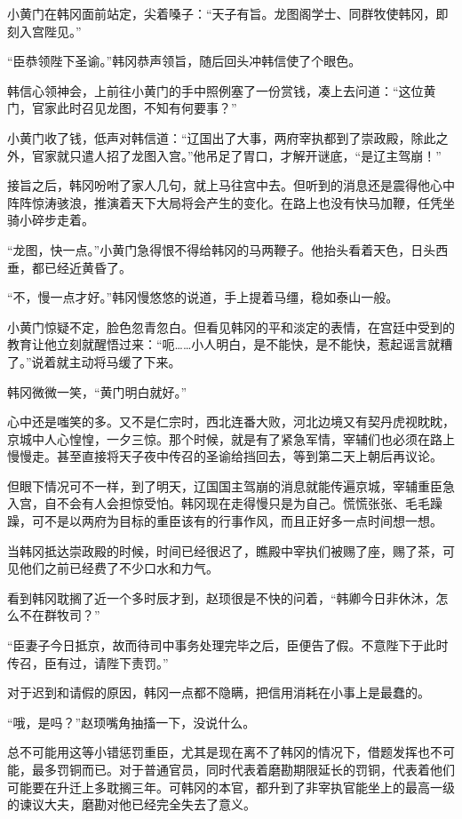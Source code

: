 小黄门在韩冈面前站定，尖着嗓子：“天子有旨。龙图阁学士、同群牧使韩冈，即刻入宫陛见。”

“臣恭领陛下圣谕。”韩冈恭声领旨，随后回头冲韩信使了个眼色。

韩信心领神会，上前往小黄门的手中照例塞了一份赏钱，凑上去问道：“这位黄门，官家此时召见龙图，不知有何要事？”

小黄门收了钱，低声对韩信道：“辽国出了大事，两府宰执都到了崇政殿，除此之外，官家就只遣人招了龙图入宫。”他吊足了胃口，才解开谜底，“是辽主驾崩！”

接旨之后，韩冈吩咐了家人几句，就上马往宫中去。但听到的消息还是震得他心中阵阵惊涛骇浪，推演着天下大局将会产生的变化。在路上也没有快马加鞭，任凭坐骑小碎步走着。

“龙图，快一点。”小黄门急得恨不得给韩冈的马两鞭子。他抬头看着天色，日头西垂，都已经近黄昏了。

“不，慢一点才好。”韩冈慢悠悠的说道，手上提着马缰，稳如泰山一般。

小黄门惊疑不定，脸色忽青忽白。但看见韩冈的平和淡定的表情，在宫廷中受到的教育让他立刻就醒悟过来：“呃……小人明白，是不能快，是不能快，惹起谣言就糟了。”说着就主动将马缓了下来。

韩冈微微一笑，“黄门明白就好。”

心中还是嗤笑的多。又不是仁宗时，西北连番大败，河北边境又有契丹虎视眈眈，京城中人心惶惶，一夕三惊。那个时候，就是有了紧急军情，宰辅们也必须在路上慢慢走。甚至直接将天子夜中传召的圣谕给挡回去，等到第二天上朝后再议论。

但眼下情况可不一样，到了明天，辽国国主驾崩的消息就能传遍京城，宰辅重臣急入宫，自不会有人会担惊受怕。韩冈现在走得慢只是为自己。慌慌张张、毛毛躁躁，可不是以两府为目标的重臣该有的行事作风，而且正好多一点时间想一想。

当韩冈抵达崇政殿的时候，时间已经很迟了，瞧殿中宰执们被赐了座，赐了茶，可见他们之前已经费了不少口水和力气。

看到韩冈耽搁了近一个多时辰才到，赵顼很是不快的问着，“韩卿今日非休沐，怎么不在群牧司？”

“臣妻子今日抵京，故而待司中事务处理完毕之后，臣便告了假。不意陛下于此时传召，臣有过，请陛下责罚。”

对于迟到和请假的原因，韩冈一点都不隐瞒，把信用消耗在小事上是最蠢的。

“哦，是吗？”赵顼嘴角抽搐一下，没说什么。

总不可能用这等小错惩罚重臣，尤其是现在离不了韩冈的情况下，借题发挥也不可能，最多罚铜而已。对于普通官员，同时代表着磨勘期限延长的罚铜，代表着他们可能要在升迁上多耽搁三年。可韩冈的本官，都升到了非宰执官能坐上的最高一级的谏议大夫，磨勘对他已经完全失去了意义。

